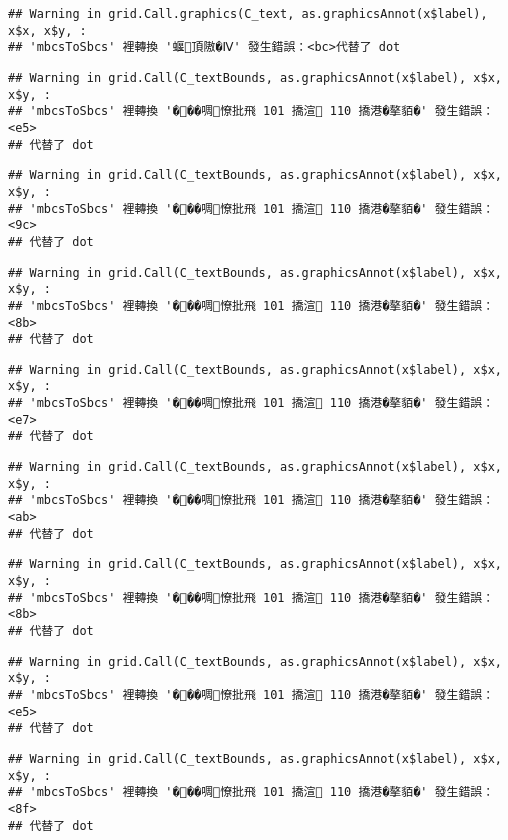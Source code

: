 \documentclass[
]{article}
\begin{document}
\begin{verbatim}
## Warning in grid.Call.graphics(C_text, as.graphicsAnnot(x$label), x$x, x$y, :
## 'mbcsToSbcs' 裡轉換 '蝘頂隞�Ⅳ' 發生錯誤：<bc>代替了 dot
\end{verbatim}

\begin{verbatim}
## Warning in grid.Call(C_textBounds, as.graphicsAnnot(x$label), x$x, x$y, :
## 'mbcsToSbcs' 裡轉換 '���啁憭批飛 101 撟渲 110 撟港�摮貊�' 發生錯誤：<e5>
## 代替了 dot
\end{verbatim}

\begin{verbatim}
## Warning in grid.Call(C_textBounds, as.graphicsAnnot(x$label), x$x, x$y, :
## 'mbcsToSbcs' 裡轉換 '���啁憭批飛 101 撟渲 110 撟港�摮貊�' 發生錯誤：<9c>
## 代替了 dot
\end{verbatim}

\begin{verbatim}
## Warning in grid.Call(C_textBounds, as.graphicsAnnot(x$label), x$x, x$y, :
## 'mbcsToSbcs' 裡轉換 '���啁憭批飛 101 撟渲 110 撟港�摮貊�' 發生錯誤：<8b>
## 代替了 dot
\end{verbatim}

\begin{verbatim}
## Warning in grid.Call(C_textBounds, as.graphicsAnnot(x$label), x$x, x$y, :
## 'mbcsToSbcs' 裡轉換 '���啁憭批飛 101 撟渲 110 撟港�摮貊�' 發生錯誤：<e7>
## 代替了 dot
\end{verbatim}

\begin{verbatim}
## Warning in grid.Call(C_textBounds, as.graphicsAnnot(x$label), x$x, x$y, :
## 'mbcsToSbcs' 裡轉換 '���啁憭批飛 101 撟渲 110 撟港�摮貊�' 發生錯誤：<ab>
## 代替了 dot
\end{verbatim}

\begin{verbatim}
## Warning in grid.Call(C_textBounds, as.graphicsAnnot(x$label), x$x, x$y, :
## 'mbcsToSbcs' 裡轉換 '���啁憭批飛 101 撟渲 110 撟港�摮貊�' 發生錯誤：<8b>
## 代替了 dot
\end{verbatim}

\begin{verbatim}
## Warning in grid.Call(C_textBounds, as.graphicsAnnot(x$label), x$x, x$y, :
## 'mbcsToSbcs' 裡轉換 '���啁憭批飛 101 撟渲 110 撟港�摮貊�' 發生錯誤：<e5>
## 代替了 dot
\end{verbatim}

\begin{verbatim}
## Warning in grid.Call(C_textBounds, as.graphicsAnnot(x$label), x$x, x$y, :
## 'mbcsToSbcs' 裡轉換 '���啁憭批飛 101 撟渲 110 撟港�摮貊�' 發生錯誤：<8f>
## 代替了 dot
\end{verbatim}
\end{document}
